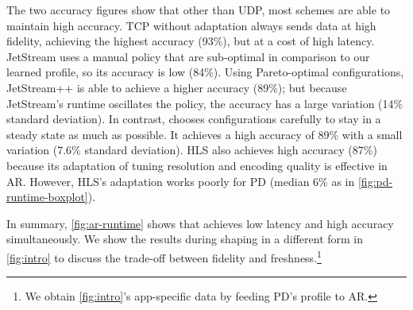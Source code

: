 The two accuracy figures show that other than UDP, most schemes are able to
maintain high accuracy. TCP without adaptation always sends data at high
fidelity, achieving the highest accuracy (93\%), but at a cost of high
latency. JetStream uses a manual policy that are sub-optimal in comparison to
our learned profile, so its accuracy is low (84\%). Using Pareto-optimal
configurations, JetStream++ is able to achieve a higher accuracy (89\%); but
because JetStream's runtime oscillates the policy, the accuracy has a large
variation (14\% standard deviation). In contrast, \sysname{} chooses
configurations carefully to stay in a steady state as much as possible.  It
achieves a high accuracy of 89\% with a small variation (7.6\% standard
deviation). HLS also achieves high accuracy (87\%) because its adaptation of
tuning resolution and encoding quality is effective in AR. However, HLS's
adaptation works poorly for PD (median 6\% as in
\autoref{fig:pd-runtime-boxplot}).


In summary, \autoref{fig:ar-runtime} shows that \sysname{} achieves low latency
and high accuracy simultaneously. We show the results during shaping in a
different form in \autoref{fig:intro} to discuss the trade-off between fidelity
and freshness.\footnote{We obtain \autoref{fig:intro}'s app-specific data by
  feeding PD's profile to AR.}

